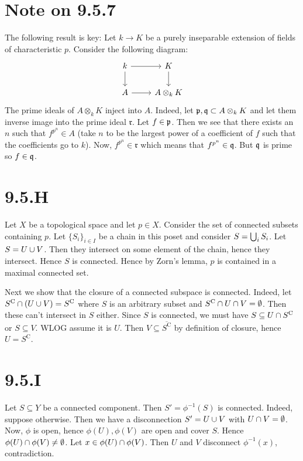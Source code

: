 \documentclass{article}
\begin{document}
\section{Note on 9.5.7}
The following result is key: Let $k \to K$ be a purely inseparable
extension of fields of characteristic $p$. Consider the
following diagram: \[\begin{tikzcd}
        k & K             \\
        A & {A\otimes_kK}
        \arrow[from=1-2, to=2-2] \arrow[from=2-1, to=2-2] \arrow[from=1-1, to=2-1]
        \arrow[from=1-1, to=1-2]
    \end{tikzcd}\] The prime ideals of
$A\otimes_kK$ inject into $A$. Indeed, let
$\mathfrak{p}, \mathfrak{q} \subset A\otimes_kK$ and let them inverse image into the prime ideal
$\mathfrak{r}$. Let $f \in \mathfrak{p}$. Then we see that there
exists an $n$ such that $f^{p^n} \in A$ (take
$n$ to be the largest power of a coefficient of
$f$ such that the coefficients go to
$k$). Now, $f^{p^n} \in \mathfrak{r}$ which means that
$f^{p^n} \in \mathfrak{q}$. But $\mathfrak{q}$ is prime so
$f \in \mathfrak{q}$.

\section{9.5.H}
Let $X$ be a topological space and let
$p \in X$. Consider the set of connected subsets containing
$p$. Let $\{S_i\}_{i \in I}$ be a chain in this poset
and consider $S=\bigcup_i S_i$. Let $S=U \cup V$. Then they
intersect on some element of the chain, hence they intersect. Hence
$S$ is connected. Hence by Zorn's lemma,
$p$ is contained in a maximal connected set.

Next we show that the closure of a connected subspace is connected. Indeed, let
$S^{\text{C}} \cap (U \cup V) =
    S^{\text{C}}$ where $S$ is an arbitrary subset
and $S^{\text{C}} \cap U \cap V = \emptyset$. Then these can't intersect in
$S$ either. Since $S$ is connected, we
must have $S \subseteq U \cap S^{\text{C}}$ or $S \subseteq V$. WLOG assume it is
$U$. Then $V \subseteq \overline{S^{\text{C}}}$ by definition of closure,
hence $U=S^{\text{C}}$.

\section{9.5.I}
Let $S \subseteq Y$ be a connected component. Then
$S'=\phi^{-1}(S)$ is connected. Indeed, suppose otherwise. Then we have a
disconnection $S'=U \cup V$ with $U \cap V = \emptyset$. Now,
$\phi$ is open, hence $\phi(U), \phi(V)$ are open and
cover $S$. Hence $\phi(U) \cap \phi(V) \neq \emptyset$. Let
$x \in \phi(U) \cap \phi(V)$. Then $U$ and
$V$ disconnect $\phi^{-1}(x)$, contradiction.
\end{document}
